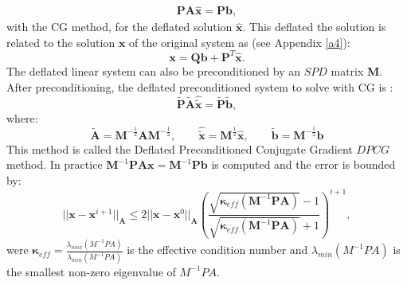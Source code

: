 \documentclass[review]{elsarticle}
\begin{document}
\begin{align}\label{eq:defsol}
\mathbf{P}\mathbf{A} \hat{\mathbf{x}}=\mathbf{P}\mathbf{b},
\end{align}
with the CG method, for the deflated solution $\hat{\mathbf{x}}$. 
This deflated the solution is related to the solution $\mathbf{x}$ of the original system as (see Appendix \ref{a4}):
\begin{equation}\label{eq:xfromxh}
    \mathbf{x}=\mathbf{Q}\mathbf{b}+\mathbf{P}^T\mathbf{\hat{x}}.
\end{equation}
The deflated linear system can also be preconditioned by an $SPD$ matrix $\mathbf{M}$. After preconditioning, the deflated preconditioned system to solve with CG is \cite{Tang09}:
$$\tilde{\mathbf{P}} \tilde{\mathbf{A}} \hat{\tilde{\mathbf{x}}}=\tilde{\mathbf{P}}\tilde{\mathbf{b}},$$
where:
\begin{equation*}
 \tilde{\mathbf{A}}=\mathbf{M}^{-\frac{1}{2}}\mathbf{A}\mathbf{M}^{-\frac{1}{2}}, \qquad \hat{\tilde{\mathbf{x}}}=\mathbf{M}^{\frac{1}{2}}\hat{\mathbf{x}}, \qquad
 \tilde{\mathbf{b}}=\mathbf{M}^{-\frac{1}{2}}\mathbf{b}
\end{equation*}
This method is called the Deflated Preconditioned Conjugate Gradient $DPCG$ method.
In practice $\mathbf{M}^{-1}\mathbf{P}\mathbf{A}\mathbf{x}=\mathbf{M}^{-1}\mathbf{P}\mathbf{b}$ is computed and the error is bounded by:
\begin{equation*}
 ||\mathbf{x}-\mathbf{x}^{i+1}||_\mathbf{A}\leq 2||\mathbf{x}-\mathbf{x}^{0}||_\mathbf{A} \left( \frac{\sqrt{\mathbf{\kappa}_{eff}(\mathbf{M}^{-1}\mathbf{P}\mathbf{A})}-1}{\sqrt{\mathbf{\kappa}_{eff}(\mathbf{M}^{-1}\mathbf{P}\mathbf{A})}+1} \right)^{i+1},
\end{equation*}
were $\mathbf{\kappa}_{eff}=\frac{\lambda_{max}(M^{-1}PA)}{\lambda_{min}(M^{-1}PA)}$ is the effective condition 
number and $\lambda_{min}(M^{-1}PA)$ is the smallest non-zero eigenvalue of $M^{-1}PA$.
\end{document}
